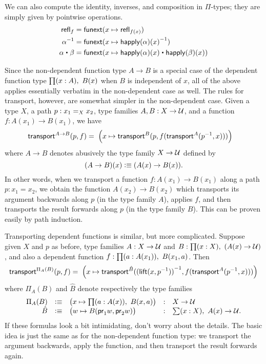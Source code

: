 We can also compute the identity, inverses, and composition in $\Pi$-types; they are simply given by pointwise operations.
\begin{align*}
\refl{f} &= \funext(x \mapsto \refl{f(x)}) \\
\opp{\alpha} &= \funext (x \mapsto \opp{\happly (\alpha)(x)})  \\
{\alpha} \ct \beta &= \funext (x \mapsto {\happly({\alpha})(x) \ct \happly({\beta})(x)})
\end{align*}

Since the non-dependent function type $A\to B$ is a special case of the dependent function type $\prd{x:A} B(x)$ when $B$ is independent of $x$, all of the above applies essentially verbatim in the non-dependent case as well.
The rules for transport, however, are somewhat simpler in the non-dependent case.
Given a type $X$, a path $p:\id[X]{x_1}{x_2}$, type families $A,B:X\to \type$, and a function $f : A(x_1) \to B(x_1)$,  we have
\begin{align}\label{eq:transport-arrow}
  \transfib{A\to B}{p}{f} &=
  \; \Big(x \mapsto \transfib{B}{p}{f(\transfib{A}{\opp p}{x})}\Big)
\end{align}
where $A\to B$ denotes abusively the type family $X\to \type$ defined by
\[(A\to B)(x) \defeq (A(x)\to B(x)).\]
In other words, when we transport a function $f:A(x_1)\to B(x_1)$ along a path $p:x_1=x_2$, we obtain the function $A(x_2)\to B(x_2)$ which transports its argument backwards along $p$ (in the type family $A$), applies $f$, and then transports the result forwards along $p$ (in the type family $B$).
This can be proven easily by path induction.

Transporting dependent functions is similar, but more complicated.
Suppose given $X$ and $p$ as before, type families $A:X\to \type$ and $B:\prd{x:X} (A(x)\to\type)$, and also a dependent function $f : \prd{a:A(x_1)} B(x_1,a)$.
Then
\begin{align*}
  \transfib{\Pi_A(B)}{p}{f} =
  \;\Big(x \mapsto \transfib{\hat{B}}{\opp{(\mathsf{lift}(x,\opp{p}))}}{f (\transfib{A}{\opp p}x)}\Big)
\end{align*}
where $\Pi_A(B)$ and $\hat{B}$ denote respectively the type families
\[
\begin{array}{rclcl}
\Pi_A(B) &\defeq& \big(x\mapsto \prd{a:A(x)} B(x,a) \big) &:& X\to \type\\
\hat{B} &\defeq& \big(w \mapsto B(\proj1w,\proj2w) \big) &:& \sm{x:X} A(x) \to \type.
\end{array}
\]
If these formulas look a bit intimidating, don't worry about the details.
The basic idea is just the same as for the non-dependent function type: we transport the argument backwards, apply the function, and then transport the result forwards again.


